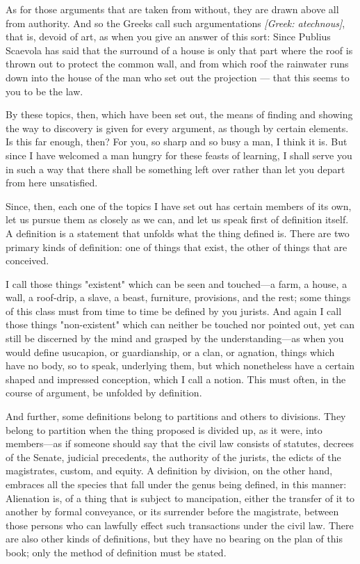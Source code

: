  As for those arguments that are taken from without, they are drawn above all from authority. And so the Greeks call such argumentations \textit{[Greek: atechnous]}, that is, devoid of art, as when you give an answer of this sort: Since Publius Scaevola has said that the surround of a house is only that part where the roof is thrown out to protect the common wall, and from which roof the rainwater runs down into the house of the man who set out the projection — that this seems to you to be the law.

 By these topics, then, which have been set out, the means of finding and showing the way to discovery is given for every argument, as though by certain elements. Is this far enough, then? For you, so sharp and so busy a man, I think it is. But since I have welcomed a man hungry for these feasts of learning, I shall serve you in such a way that there shall be something left over rather than let you depart from here unsatisfied.

 Since, then, each one of the topics I have set out has certain members of its own, let us pursue them as closely as we can, and let us speak first of definition itself. A definition is a statement that unfolds what the thing defined is. There are two primary kinds of definition: one of things that exist, the other of things that are conceived.

 I call those things "existent" which can be seen and touched—a farm, a house, a wall, a roof-drip, a slave, a beast, furniture, provisions, and the rest; some things of this class must from time to time be defined by you jurists. And again I call those things "non-existent" which can neither be touched nor pointed out, yet can still be discerned by the mind and grasped by the understanding—as when you would define usucapion, or guardianship, or a clan, or agnation, things which have no body, so to speak, underlying them, but which nonetheless have a certain shaped and impressed conception, which I call a notion. This must often, in the course of argument, be unfolded by definition.

 And further, some definitions belong to partitions and others to divisions. They belong to partition when the thing proposed is divided up, as it were, into members—as if someone should say that the civil law consists of statutes, decrees of the Senate, judicial precedents, the authority of the jurists, the edicts of the magistrates, custom, and equity. A definition by division, on the other hand, embraces all the species that fall under the genus being defined, in this manner: Alienation is, of a thing that is subject to mancipation, either the transfer of it to another by formal conveyance, or its surrender before the magistrate, between those persons who can lawfully effect such transactions under the civil law. There are also other kinds of definitions, but they have no bearing on the plan of this book; only the method of definition must be stated.

